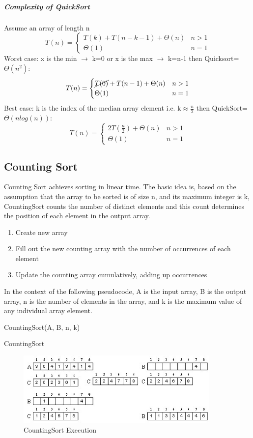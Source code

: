 \documentclass[12pt,letterpaper]{article}
\begin{document}
\subparagraph{Complexity of QuickSort}
Assume an array of length n
\[T(n)=\begin{cases}T(k)+T(n-k-1)+\Theta(n) & n>1 \\ \Theta(1) & n=1 \end{cases}\]
Worst case: x is the min $\to$ k=0 or x is the max $\to$ k=n-1 then Quicksort=$\Theta(n^2)$:
\[T(n)=\begin{cases} \cancel{T(0)} +T(n-1)+\Theta(n) & n>1 \\ \Theta(1) & n=1 \end{cases}\]
Best case: k is the index of the median array element i.e. k$\approx\frac{n}{2}$ then QuickSort=$\Theta(nlog(n))$:
\[T(n)=\begin{cases}2T(\frac{n}{2})+\Theta(n) & n>1 \\ \Theta(1) & n=1 \end{cases}\]
\subsection{Counting Sort}
Counting Sort achieves sorting in linear time. The basic idea is, based on the assumption that the array to be sorted is of size n, and its maximum integer is k, CountingSort counts the number of distinct elements and this count determines the position of each element in the output array.
\begin{enumerate}
\item Create new array
\item Fill out the new counting array with the number of occurrences of each element
\item Update the counting array cumulatively, adding up occurrences 
\end{enumerate}
In the context of the following pseudocode, A is the input array, B is the output array, n is the number of elements in the array, and k is the maximum value of any individual array element.
\begin{algorithm}
CountingSort(A, B, n, k)
\label{CountingSort}
\caption{CountingSort}
\end{algorithm}
\begin{figure}[htb!]
\centering
\includegraphics[width=10cm]{countingsort}
\caption{CountingSort Execution}
\end{figure}
\pagebreak
\end{document}
